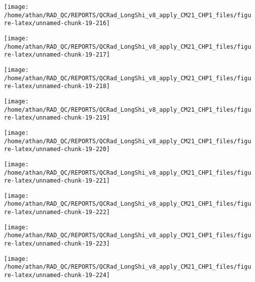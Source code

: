 \documentclass[
  10pt,
  a4paper,oneside]{article}
\begin{document}
\begin{center}\texttt{[image: /home/athan/RAD\_QC/REPORTS/QCRad\_LongShi\_v8\_apply\_CM21\_CHP1\_files/figure-latex/unnamed-chunk-19-216]} \end{center}

\begin{center}\texttt{[image: /home/athan/RAD\_QC/REPORTS/QCRad\_LongShi\_v8\_apply\_CM21\_CHP1\_files/figure-latex/unnamed-chunk-19-217]} \end{center}

\begin{center}\texttt{[image: /home/athan/RAD\_QC/REPORTS/QCRad\_LongShi\_v8\_apply\_CM21\_CHP1\_files/figure-latex/unnamed-chunk-19-218]} \end{center}

\begin{center}\texttt{[image: /home/athan/RAD\_QC/REPORTS/QCRad\_LongShi\_v8\_apply\_CM21\_CHP1\_files/figure-latex/unnamed-chunk-19-219]} \end{center}

\begin{center}\texttt{[image: /home/athan/RAD\_QC/REPORTS/QCRad\_LongShi\_v8\_apply\_CM21\_CHP1\_files/figure-latex/unnamed-chunk-19-220]} \end{center}

\begin{center}\texttt{[image: /home/athan/RAD\_QC/REPORTS/QCRad\_LongShi\_v8\_apply\_CM21\_CHP1\_files/figure-latex/unnamed-chunk-19-221]} \end{center}

\begin{center}\texttt{[image: /home/athan/RAD\_QC/REPORTS/QCRad\_LongShi\_v8\_apply\_CM21\_CHP1\_files/figure-latex/unnamed-chunk-19-222]} \end{center}

\begin{center}\texttt{[image: /home/athan/RAD\_QC/REPORTS/QCRad\_LongShi\_v8\_apply\_CM21\_CHP1\_files/figure-latex/unnamed-chunk-19-223]} \end{center}

\begin{center}\texttt{[image: /home/athan/RAD\_QC/REPORTS/QCRad\_LongShi\_v8\_apply\_CM21\_CHP1\_files/figure-latex/unnamed-chunk-19-224]} \end{center}
\end{document}
